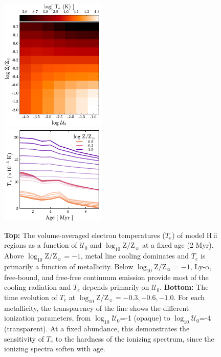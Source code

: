\documentclass[linenumbers, trackchanges, tighten]{aastex61}%
\newcommand{\logten}{\ensuremath{\log_{10}}}
\newcommand{\Te}{\ensuremath{T_{e}}}
\newcommand{\hii}{H\,{\sc ii}\xspace}
\newcommand{\logz}{\ensuremath{\logten \mathrm{Z}/\mathrm{Z}_{\sun}}}
\newcommand{\logZeq}[1]{\ensuremath{\logten \mathrm{Z}/\mathrm{Z}_{\sun} = #1}}
\newcommand{\U}{\ensuremath{\mathcal{U}_{0}}}
\newcommand{\logU}{\ensuremath{\logten \mathcal{U}_0}}
\begin{document}
\begin{figure}[!htbp]
  \begin{centering}
    \includegraphics[width=0.45\textwidth]{f6a.pdf}\\
    \includegraphics[width=0.45\textwidth]{f6b.pdf}
    \caption{\textbf{Top:} The volume-averaged electron temperatures (\Te{}) of model \hii regions as a function of \U{} and \logz{} at a fixed age (2 Myr). Above \logZeq{-1}, metal line cooling dominates and \Te{} is primarily a function of metallicity. Below \logZeq{-1}, Ly-$\alpha$, free-bound, and free-free continuum emission provide most of the cooling radiation and \Te{} depends primarily on \U{}. \textbf{Bottom:} The time evolution of \Te{} at \logZeq{-0.3, -0.6, -1.0}. For each metallicity, the transparency of the line shows the different ionization parameters, from \logU{}=-1 (opaque) to \logU{}=-4 (transparent). At a fixed abundance, this demonstrates the sensitivity of \Te{} to the hardness of the ionizing spectrum, since the ionizing spectra soften with age.} 
    \label{fig:temp}
  \end{centering}
\end{figure}
\end{document}
